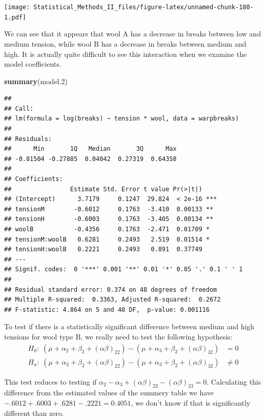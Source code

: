 \documentclass[]{book}
\newenvironment{Shaded}{\begin{snugshade}}{\end{snugshade}}
\newcommand{\KeywordTok}[1]{\textcolor[rgb]{0.13,0.29,0.53}{\textbf{{#1}}}}
\newcommand{\FloatTok}[1]{\textcolor[rgb]{0.00,0.00,0.81}{{#1}}}
\newcommand{\NormalTok}[1]{{#1}}
\theoremstyle{definition}
\theoremstyle{definition}
\theoremstyle{remark}
\begin{document}
\texttt{[image: Statistical\_Methods\_II\_files/figure-latex/unnamed-chunk-180-1.pdf]}

We can see that it appears that wool A has a decrease in breaks between
low and medium tension, while wool B has a decrease in breaks between
medium and high. It is actually quite difficult to see this interaction
when we examine the model coefficients.

\begin{Shaded}
\begin{Highlighting}[]
\KeywordTok{summary}\NormalTok{(model}\FloatTok{.2}\NormalTok{)}
\end{Highlighting}
\end{Shaded}

\begin{verbatim}
## 
## Call:
## lm(formula = log(breaks) ~ tension * wool, data = warpbreaks)
## 
## Residuals:
##      Min       1Q   Median       3Q      Max 
## -0.81504 -0.27885  0.04042  0.27319  0.64358 
## 
## Coefficients:
##                Estimate Std. Error t value Pr(>|t|)    
## (Intercept)      3.7179     0.1247  29.824  < 2e-16 ***
## tensionM        -0.6012     0.1763  -3.410  0.00133 ** 
## tensionH        -0.6003     0.1763  -3.405  0.00134 ** 
## woolB           -0.4356     0.1763  -2.471  0.01709 *  
## tensionM:woolB   0.6281     0.2493   2.519  0.01514 *  
## tensionH:woolB   0.2221     0.2493   0.891  0.37749    
## ---
## Signif. codes:  0 '***' 0.001 '**' 0.01 '*' 0.05 '.' 0.1 ' ' 1
## 
## Residual standard error: 0.374 on 48 degrees of freedom
## Multiple R-squared:  0.3363, Adjusted R-squared:  0.2672 
## F-statistic: 4.864 on 5 and 48 DF,  p-value: 0.001116
\end{verbatim}

To test if there is a statistically significant difference between
medium and high tensions for wool type B, we really need to test the
following hypothesis: \[\begin{aligned}
H_{0}:\;\left(\mu+\alpha_{2}+\beta_{2}+\left(\alpha\beta\right)_{22}\right)-\left(\mu+\alpha_{3}+\beta_{2}+\left(\alpha\beta\right)_{32}\right) & =   0 \\
H_{a}:\;\left(\mu+\alpha_{2}+\beta_{2}+\left(\alpha\beta\right)_{22}\right)-\left(\mu+\alpha_{3}+\beta_{2}+\left(\alpha\beta\right)_{32}\right) &\ne    0
\end{aligned}\]

This test reduces to testing if
\(\alpha_{2}-\alpha_{3}+\left(\alpha\beta\right)_{22}-\left(\alpha\beta\right)_{23}=0\).
Calculating this difference from the estimated values of the summery
table we have \(-.6012+.6003+.6281-.2221=0.4051\), we don't know if that
is significantly different than zero.
\end{document}
